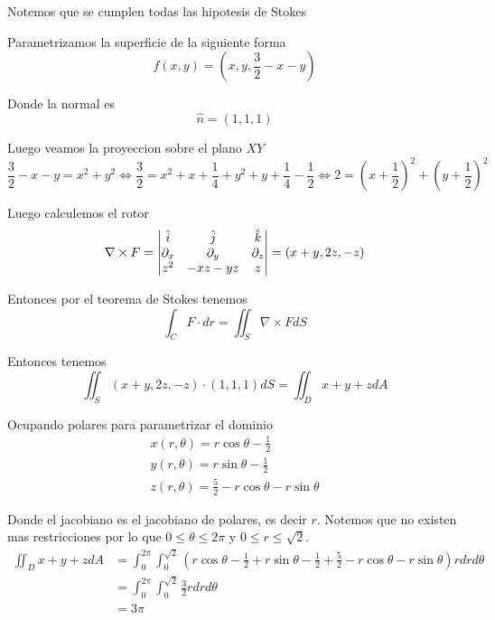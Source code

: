 \documentclass[../main.tex]{subfiles}
\begin{document}
\begin{solution}
  Notemos que se cumplen todas las hipotesis de Stokes

  Parametrizamos la superficie de la siguiente forma
  \begin{equation*}
    f(x, y) = (x, y, \frac32 - x - y)
  \end{equation*}

  Donde la normal es
  \begin{equation*}
    \hat{n} = (1, 1, 1)
  \end{equation*}

  Luego veamos la proyeccion sobre el plano $XY$
  \begin{equation*}
    \frac32 - x - y = x^{2} + y^{2} \iff \frac32 = x^{2} + x + \frac14 + y^{2} + y + \frac14 - \frac12 \iff 2 = (x + \frac12)^{2} + (y + \frac12)^{2}
  \end{equation*}

  Luego calculemos el rotor
  \begin{equation*}
    \nabla \times F = \begin{vmatrix} \hat{i} & \hat{j} & \hat{k}\\ \partial_x & \partial_y & \partial_z\\ z^{2} & -xz - yz & z\end{vmatrix} = (x + y, 2z, -z)
  \end{equation*}


  Entonces por el teorema de Stokes tenemos
  \begin{equation*}
    \int_{C} F \cdot dr = \iint_{S} \nabla \times F dS
  \end{equation*}

  Entonces tenemos
  \begin{equation*}
    \iint_{S} (x + y, 2z, -z) \cdot (1, 1, 1) dS = \iint_{D} x + y + z dA
  \end{equation*}

  Ocupando polares para parametrizar el dominio
  \begin{gather*}
    x(r, \theta) = r \cos \theta - \frac12\\
    y(r, \theta) = r \sin \theta - \frac12\\
    z(r, \theta) = \frac52 - r \cos \theta - r \sin \theta
  \end{gather*}

  Donde el jacobiano es el jacobiano de polares, es decir $r$. Notemos que no existen mas restricciones por lo que $0 \leq \theta \leq 2\pi$ y $0 \leq r \leq \sqrt{2}$.
  \begin{align}
    \iint_{D} x + y + z dA &= \int_{0}^{2\pi}\int_{0}^{\sqrt2} (r \cos \theta - \frac12 + r \sin \theta - \frac12 + \frac52 - r \cos \theta - r \sin \theta)r dr d \theta\\
                           &= \int_{0}^{2\pi}\int_{0}^{\sqrt2} \frac32 r dr d \theta\\
                           &= 3\pi
  \end{align}
\end{solution}
\end{document}
